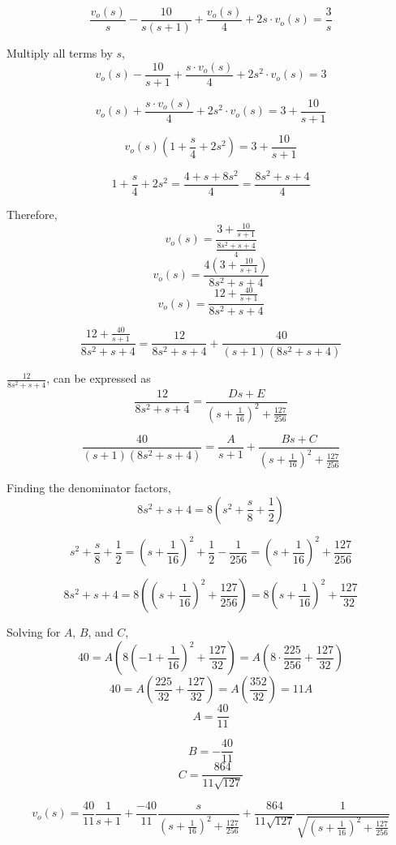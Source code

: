 \documentclass{article}
\begin{document}
$$\frac{v_o(s)}{s} - \frac{10}{s(s+1)} + \frac{v_o(s)}{4} + 2s\cdot v_o(s) = \frac{3}{s}$$

Multiply all terms by $s$,
$$v_o(s) - \frac{10}{s+1} + \frac{s\cdot v_o(s)}{4} + 2s^2\cdot v_o(s) = 3$$

$$v_o(s) + \frac{s\cdot v_o(s)}{4} + 2s^2\cdot v_o(s) = 3 + \frac{10}{s+1}$$

$$v_o(s)\left(1 + \frac{s}{4} + 2s^2\right) = 3 + \frac{10}{s+1}$$

$$1 + \frac{s}{4} + 2s^2 = \frac{4 + s + 8s^2}{4} = \frac{8s^2 + s + 4}{4}$$

Therefore,
$$v_o(s) = \frac{3 + \frac{10}{s+1}}{\frac{8s^2 + s + 4}{4}}$$
$$v_o(s) = \frac{4\left(3 + \frac{10}{s+1}\right)}{8s^2 + s + 4}$$
$$v_o(s) = \frac{12 + \frac{40}{s+1}}{8s^2 + s + 4}$$

$$\frac{12 + \frac{40}{s+1}}{8s^2 + s + 4} = \frac{12}{8s^2 + s + 4} + \frac{40}{(s+1)(8s^2 + s + 4)}$$

$ \frac{12}{8s^2 + s + 4}$, can be expressed as
$$\frac{12}{8s^2 + s + 4} = \frac{Ds + E}{\left(s + \frac{1}{16}\right)^2 + \frac{127}{256}}$$

$$\frac{40}{(s+1)(8s^2 + s + 4)} = \frac{A}{s+1} + \frac{Bs + C}{\left(s + \frac{1}{16}\right)^2 + \frac{127}{256}}$$

Finding the denominator factors,
$$8s^2 + s + 4 = 8\left(s^2 + \frac{s}{8} + \frac{1}{2}\right)$$

$$s^2 + \frac{s}{8} + \frac{1}{2} = \left(s + \frac{1}{16}\right)^2 + \frac{1}{2} - \frac{1}{256} = \left(s + \frac{1}{16}\right)^2 + \frac{127}{256}$$

$$8s^2 + s + 4 = 8\left(\left(s + \frac{1}{16}\right)^2 + \frac{127}{256}\right) = 8\left(s + \frac{1}{16}\right)^2 + \frac{127}{32}$$

Solving for $A$, $B$, and $C$,
$$40 = A\left(8\left(-1 + \frac{1}{16}\right)^2 + \frac{127}{32}\right) = A\left(8\cdot\frac{225}{256} + \frac{127}{32}\right)$$
$$40 = A\left(\frac{225}{32} + \frac{127}{32}\right) = A\left(\frac{352}{32}\right) = 11A$$
$$A = \frac{40}{11}$$

$$B = -\frac{40}{11}$$
$$C = \frac{864}{11\sqrt{127}}$$

$$v_o(s) = \frac{40}{11}\frac{1}{s+1} + \frac{-40}{11}\frac{s}{\left(s + \frac{1}{16}\right)^2 + \frac{127}{256}} + \frac{864}{11\sqrt{127}}\frac{1}{\sqrt{\left(s + \frac{1}{16}\right)^2 + \frac{127}{256}}}$$
\end{document}
